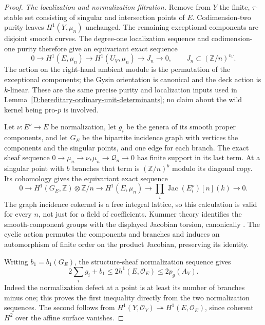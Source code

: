 \begin{proof}
\emph{The localization and normalization filtration.}
Remove from $Y$ the finite, $\tau$-stable set consisting
of singular and intersection points of $E$.
Codimension-two purity leaves $H^1(Y,\mu_n)$ unchanged.
The remaining exceptional components are disjoint smooth
curves. The degree-one localization sequence and
codimension-one purity therefore give an equivariant
exact sequence
\[
 0\longrightarrow H^1(E,\mu_n)
  \longrightarrow H^1(U_V,\mu_n)
  \longrightarrow J_n\longrightarrow0,
 \qquad J_n\subset(\mathbb Z/n)^{v_V}.                 \tag{D.WD.6}
\]
The action on the right-hand ambient module is the
permutation of the exceptional components; the Gysin
orientation is canonical and the deck action is $k$-linear.
These are the same precise purity and localization inputs
used in Lemma~\ref{D:hereditary-ordinary-unit-determinants};
no claim about the wild kernel being pro-$p$ is involved.

Let $\nu:E^\nu\to E$ be normalization, let $g_i$ be the
genera of its smooth proper components, and let $G_E$
be the bipartite incidence graph with vertices the
components and the singular points, and one edge for
each branch. The exact sheaf sequence
$0\to\mu_n\to\nu_*\mu_n\to\mathcal Q_n\to0$
has finite support in its last term. At a singular point
with $b$ branches that term is $(\mathbb Z/n)^b$ modulo
its diagonal copy. Its cohomology gives the equivariant
exact sequence
\[
 0\longrightarrow H^1(G_E,\mathbb Z)\otimes\mathbb Z/n
 \longrightarrow H^1(E,\mu_n)
 \longrightarrow\prod_i\operatorname{Jac}(E_i^\nu)[n](k)
 \longrightarrow0.                                    \tag{D.WD.7}
\]
The graph incidence cokernel is a free integral lattice,
so this calculation is valid for every $n$, not just
for a field of coefficients. Kummer theory identifies
the smooth-component groups with the displayed Jacobian
torsion, canonically
\citep[Lemma 59.69.1, Tag 03RQ]{StacksLocalPairCohomologyB}.
The cyclic action permutes the components and branches
and induces an automorphism of finite order on the
product Jacobian, preserving its identity.

Writing $b_1=b_1(G_E)$, the structure-sheaf normalization
sequence gives
\[
 2\sum_i g_i+b_1\le2h^1(E,\mathcal O_E)
                         \le2p_g(A_V).                 \tag{D.WD.8}
\]
Indeed the normalization defect at a point is at least
its number of branches minus one; this proves the first
inequality directly from the two normalization sequences.
The second follows from
$H^1(Y,\mathcal O_Y)\twoheadrightarrow H^1(E,\mathcal O_E)$,
since coherent $H^2$ over the affine surface vanishes.


\end{proof}
